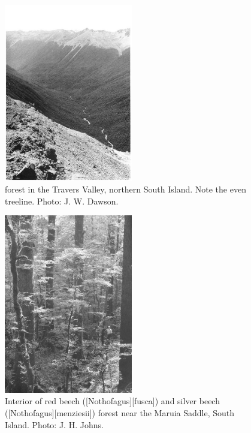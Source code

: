 \begin{figure}
	\includegraphics[width=0.5\textwidth]{graphics/figure71nothofagus-forest.jpg}
	\centering
	\caption[Nothofagus forest in the Travers Valley]{ forest in the Travers Valley, northern South Island.
	Note the even treeline.
	Photo: J. W. Dawson.}%
	\label{fig:71nothofagus-forest}
\end{figure}

\begin{figure}
	\includegraphics[width=0.5\textwidth]{graphics/figure72beech.jpg}
	\centering
	\caption[Interior of red beech and silver beech forest]{Interior of red beech ([Nothofagus][fusca]) and silver beech ([Nothofagus][menziesii]) forest near the Maruia Saddle, South Island.
	Photo: J. H. Johns.}%
	\label{fig:72beech}
\end{figure}

